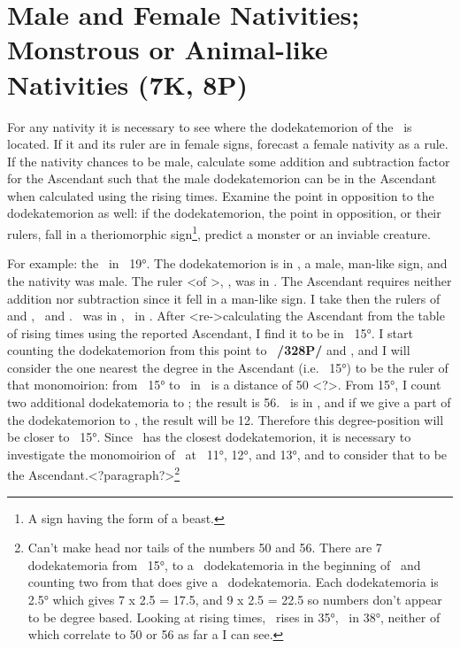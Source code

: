 \section{Male and Female Nativities; Monstrous or Animal-like Nativities (7K, 8P)}

For any nativity it is necessary to see where the dodekatemorion of the \Moon\, is located. If it and its ruler are in female signs, forecast a female nativity as a rule. If the nativity chances to be male, calculate
some addition and subtraction factor for the Ascendant such that the male dodekatemorion can be in the Ascendant when calculated using the rising times. Examine the point in opposition to the dodekatemorion as well: if the dodekatemorion, the point in opposition, or their rulers, fall in a theriomorphic sign\footnote{A sign having the form of a beast.}, predict a monster or an inviable creature.

For example: the \Moon\, in \Pisces\, 19°. The dodekatemorion is in \Libra, a male, man-like sign, and the nativity was male. The ruler <of \Libra>, \Venus, was in \Sagittarius. The Ascendant requires neither addition nor subtraction since it fell in a man-like sign. I take then the rulers of \Libra\, and \Aries, \Venus\, and \Mars. \Mars\, was in \Virgo, \Venus\, in \Sagittarius. After <re->calculating the Ascendant from the table of rising times using the reported Ascendant, I find it to be in \Leo\, 15°. I start counting the dodekatemorion from this point to \Mars\, \textbf{/328P/} and \Venus, and I will consider the one nearest the degree in the Ascendant (i.e. \Leo\, 15°) to be the ruler of that monomoirion: from \Leo\, 15° to \Mars\, in \Virgo\, is a distance of 50 <?>. From 15°, I count two additional dodekatemoria to \Scorpio; the result is 56. \Venus\, is in \Sagittarius, and if we give a part of the dodekatemorion to \Sagittarius, the result will be 12. Therefore this degree-position will be closer to \Leo\, 15°. Since \Venus\, has the closest dodekatemorion, it is necessary to investigate the monomoirion of \Venus\, at \Leo\, 11°, 12°, and 13°, and to consider that to be the Ascendant.<?paragraph?>\footnote{Can't make head nor tails of the numbers 50 and 56.  There are 7 dodekatemoria from \Leo\, 15°, to a \Virgo\, dodekatemoria in the beginning of \Virgo\, and counting two from that does give a \Scorpio\, dodekatemoria. Each dodekatemoria is 2.5° which gives 7 x 2.5 = 17.5, and 9 x 2.5 = 22.5 so numbers don't appear to be degree based. Looking at rising times, \Leo\, rises in 35°, \Virgo\, in 38°, neither of which correlate to 50 or 56 as far a I can see.}

